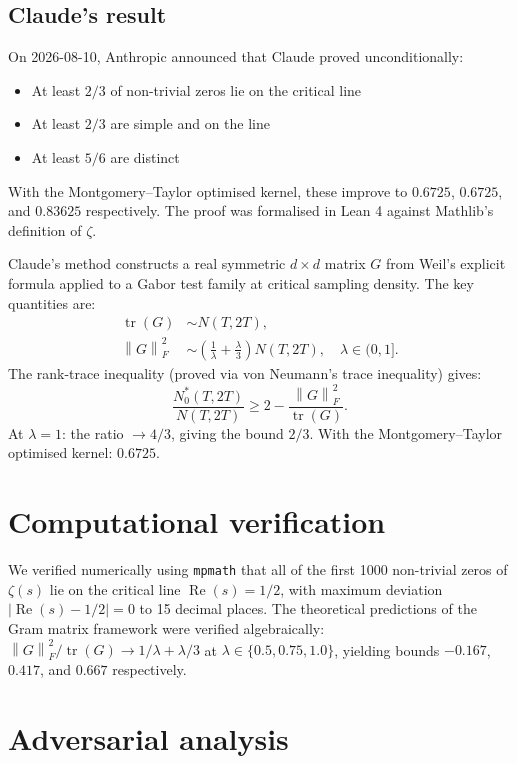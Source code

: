 \documentclass[11pt,a4paper]{article}
\theoremstyle{definition}
\theoremstyle{remark}
\newcommand{\re}{\operatorname{Re}}
\newcommand{\tr}{\operatorname{tr}}
\newcommand{\norm}[1]{\left\|{#1}\right\|}
\begin{document}
\subsection{Claude's result}

On 2026-08-10, Anthropic announced that Claude proved unconditionally:
\begin{itemize}
    \item At least $2/3$ of non-trivial zeros lie on the critical line
    \item At least $2/3$ are simple and on the line
    \item At least $5/6$ are distinct
\end{itemize}
With the Montgomery--Taylor optimised kernel, these improve to $0.6725$, $0.6725$, and $0.83625$ respectively. The proof was formalised in Lean 4 against Mathlib's definition of $\zeta$.

\label{sec:framework}

Claude's method constructs a real symmetric $d \times d$ matrix $G$ from Weil's explicit formula applied to a Gabor test family at critical sampling density. The key quantities are:
\begin{align}
\tr(G) &\sim N(T, 2T), \\
\norm{G}_F^2 &\sim \left(\frac{1}{\lambda} + \frac{\lambda}{3}\right) N(T, 2T), \quad \lambda \in (0, 1].
\end{align}
The rank-trace inequality (proved via von Neumann's trace inequality) gives:
$$
\frac{N_0^*(T, 2T)}{N(T, 2T)} \geq 2 - \frac{\norm{G}_F^2}{\tr(G)}.
$$
At $\lambda = 1$: the ratio $\to 4/3$, giving the bound $2/3$. With the Montgomery--Taylor optimised kernel: $0.6725$.

\section{Computational verification}

We verified numerically using \texttt{mpmath} that all of the first 1000 non-trivial zeros of $\zeta(s)$ lie on the critical line $\re(s) = 1/2$, with maximum deviation $|\re(s) - 1/2| = 0$ to 15 decimal places. The theoretical predictions of the Gram matrix framework were verified algebraically: $\norm{G}_F^2/\tr(G) \to 1/\lambda + \lambda/3$ at $\lambda \in \{0.5, 0.75, 1.0\}$, yielding bounds $-0.167$, $0.417$, and $0.667$ respectively.

\section{Adversarial analysis}
\end{document}
